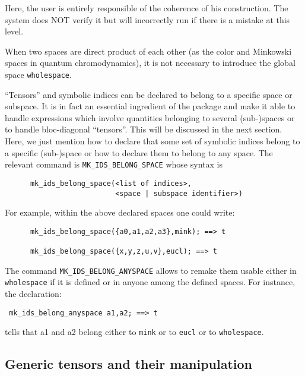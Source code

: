 Here, the user is entirely responsible of the coherence of his construction.
The system does NOT verify it but will incorrectly run if there is a mistake
at this level.

When two spaces are direct product of each other (as the color and Minkowski
spaces in quantum chromodynamics), it is not necessary to introduce the
global space \texttt{wholespace}.

``Tensors'' and symbolic indices can be declared to belong to a specific space
or subspace. It is in fact an essential ingredient of the package and make it
able to handle expressions which involve quantities belonging to several
(sub-)spaces or to handle bloc-diagonal ``tensors''.
This will be discussed in the next section.
Here, we just mention how to declare that some set of symbolic indices belong
to a specific (sub-)space or how to declare them to belong
to any space.
The relevant command is \texttt{MK\_IDS\_BELONG\_SPACE}
whose syntax is
\begin{verbatim}
      mk_ids_belong_space(<list of indices>,
                          <space | subspace identifier>)
\end{verbatim}
For example, within the above declared spaces one could write:
\begin{verbatim}
      mk_ids_belong_space({a0,a1,a2,a3},mink); ==> t

      mk_ids_belong_space({x,y,z,u,v},eucl); ==> t
\end{verbatim} 
The command \texttt{MK\_IDS\_BELONG\_ANYSPACE}
allows to remake them usable  either in \texttt{wholespace}
if it is defined or in anyone among the defined spaces.
For instance, the declaration:
\begin{verbatim}
 mk_ids_belong_anyspace a1,a2; ==> t
\end{verbatim}
tells that a1 and a2 belong either to \texttt{mink} or to \texttt{eucl} or
to \texttt{wholespace}.

\subsection{Generic tensors and their manipulation}

